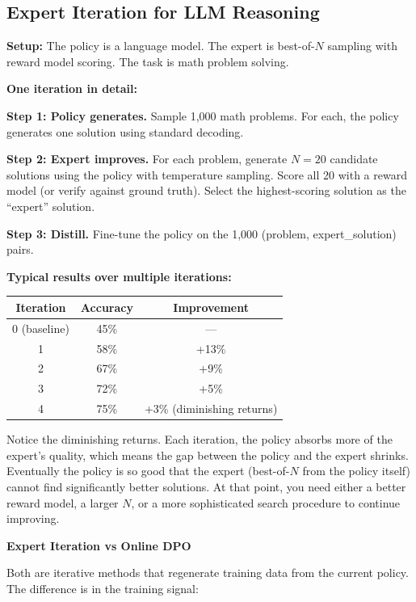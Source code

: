 \begin{chapterenv}
\subsection{Expert Iteration for LLM Reasoning}

\textbf{Setup:} The policy is a language model. The expert is best-of-$N$ sampling with reward model scoring. The task is math problem solving.

\textbf{One iteration in detail:}

\textbf{Step 1: Policy generates.} Sample 1,000 math problems. For each, the policy generates one solution using standard decoding.

\textbf{Step 2: Expert improves.} For each problem, generate $N = 20$ candidate solutions using the policy with temperature sampling. Score all 20 with a reward model (or verify against ground truth). Select the highest-scoring solution as the ``expert'' solution.

\textbf{Step 3: Distill.} Fine-tune the policy on the 1,000 (problem, expert\_solution) pairs.

\textbf{Typical results over multiple iterations:}

\begin{center}
\begin{tabular}{ccc}
\toprule
\textbf{Iteration} & \textbf{Accuracy} & \textbf{Improvement} \\
\midrule
0 (baseline) & 45\% & --- \\
1 & 58\% & +13\% \\
2 & 67\% & +9\% \\
3 & 72\% & +5\% \\
4 & 75\% & +3\% (diminishing returns) \\
\bottomrule
\end{tabular}
\end{center}

Notice the diminishing returns. Each iteration, the policy absorbs more of the expert's quality, which means the gap between the policy and the expert shrinks. Eventually the policy is so good that the expert (best-of-$N$ from the policy itself) cannot find significantly better solutions. At that point, you need either a better reward model, a larger $N$, or a more sophisticated search procedure to continue improving.

\begin{tipbox}
\textbf{Expert Iteration vs Online DPO}

Both are iterative methods that regenerate training data from the current policy. The difference is in the training signal:


\end{tipbox}
\end{chapterenv}
